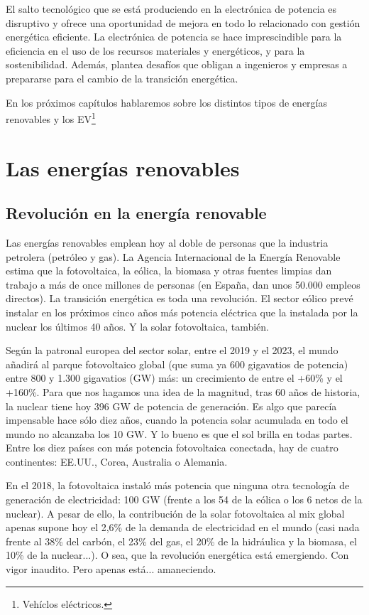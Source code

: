 \documentclass[12pt,letterpaper,superscriptaddress]{article}
\begin{document}
El salto tecnológico que se está produciendo en la electrónica de potencia es disruptivo y ofrece una oportunidad de mejora en todo lo relacionado con gestión energética eficiente. La electrónica de potencia se hace imprescindible para la eficiencia en el uso de los recursos materiales y energéticos, y para la sostenibilidad. Además, plantea desafíos que obligan a ingenieros y empresas a prepararse para el cambio de la transición energética.

En los próximos capítulos hablaremos sobre los distintos tipos de energías renovables y los EV\footnote{Vehíclos eléctricos.}


\section{Las energías renovables}

\subsection{Revolución en la energía renovable}

Las energías renovables emplean hoy al doble de personas que la industria petrolera (petróleo y gas). La Agencia Internacional de la Energía Renovable estima que la fotovoltaica, la eólica, la biomasa y otras fuentes limpias dan trabajo a más de once millones de personas (en España, dan unos 50.000 empleos directos). La transición energética es toda una revolución. El sector eólico prevé instalar en los próximos cinco años más potencia eléctrica que la instalada por la nuclear los últimos 40 años. Y la solar fotovoltaica, también.

Según la patronal europea del sector solar, entre el 2019 y el 2023, el mundo añadirá al parque fotovoltaico global (que suma ya 600 gigavatios de potencia) entre 800 y 1.300 gigavatios (GW) más: un crecimiento de entre el +60\% y el +160\%. Para que nos hagamos una idea de la magnitud, tras 60 años de historia, la nuclear tiene hoy 396 GW de potencia de generación. Es algo que parecía impensable hace sólo diez años, cuando la potencia solar acumulada en todo el mundo no alcanzaba los 10 GW. Y lo bueno es que el sol brilla en todas partes. Entre los diez países con más potencia fotovoltaica conectada, hay de cuatro continentes: EE.UU., Corea, Australia o Alemania.

En el 2018, la fotovoltaica instaló más potencia que ninguna otra tecnología de generación de electricidad: 100 GW (frente a los 54 de la eólica o los 6 netos de la nuclear). A pesar de ello, la contribución de la solar fotovoltaica al mix global apenas supone hoy el 2,6\% de la demanda de electricidad en el mundo (casi nada frente al 38\% del carbón, el 23\% del gas, el 20\% de la hidráulica y la biomasa, el 10\% de la nuclear...). O sea, que la revolución energética está emergiendo. Con vigor inaudito. Pero apenas está... amaneciendo.
\end{document}
